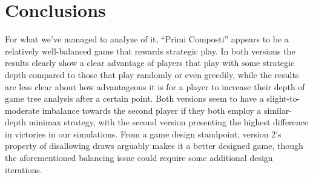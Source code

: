 \documentclass[conference]{IEEEtran}
\begin{document}
\section{Conclusions}
For what we've managed to analyze of it, ``Primi Composti'' appears to be a relatively well-balanced game that rewards strategic play. In both versions the results clearly show a clear advantage of players that play with some strategic depth compared to those that play randomly or even greedily, while the results are less clear about how advantageous it is for a player to increase their depth of game tree analysis after a certain point. Both versions seem to have a slight-to-moderate imbalance towards the second player if they both employ a similar-depth minimax strategy, with the second version presenting the highest difference in victories in our simulations. From a game design standpoint, version 2's property of disallowing draws arguably makes it a better designed game, though the aforementioned balancing issue could require some additional design iterations.



\end{document}
